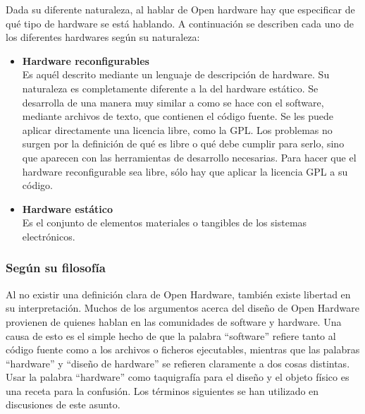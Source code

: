 Dada su diferente naturaleza, al hablar de Open hardware hay que especificar de qué tipo de hardware se está hablando. A continuación se describen cada uno de los diferentes hardwares según su naturaleza:

\begin{itemize}
\item \textbf{Hardware reconfigurables}\\
Es aquél descrito mediante un lenguaje de descripción de hardware. Su naturaleza es completamente diferente a la del hardware estático. Se desarrolla de una manera muy similar a como se hace con el software, mediante archivos de texto, que contienen el código fuente. Se les puede aplicar directamente una licencia libre, como la GPL. Los problemas no surgen por la definición de qué es libre o qué debe cumplir para serlo, sino que aparecen con las herramientas de desarrollo necesarias. Para hacer que el hardware reconfigurable sea libre, sólo hay que aplicar la licencia GPL a su código.\\
\item \textbf{Hardware estático}\\
Es el conjunto de elementos materiales o tangibles de los sistemas electrónicos.
\end{itemize}

\subsubsection*{Según su filosofía}

Al no existir una definición clara de Open Hardware, también existe libertad en su interpretación. Muchos de los argumentos acerca del diseño de Open Hardware provienen de quienes hablan en las comunidades de software y hardware. Una causa de esto es el simple hecho de que la palabra ``software'' refiere tanto al código fuente como a los archivos o ficheros ejecutables, mientras que las palabras ``hardware'' y ``diseño de hardware'' se refieren claramente a dos cosas distintas. Usar la palabra ``hardware'' como taquigrafía para el diseño y el objeto físico es una receta para la confusión. Los términos siguientes se han utilizado en discusiones de este asunto.


